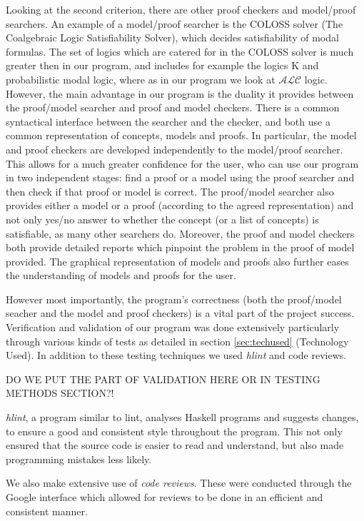 Looking at the second criterion, there are other proof checkers and model/proof searchers. An example of a model/proof searcher is the COLOSS solver (The Coalgebraic Logic Satisfiability Solver), which decides satisfiability of modal formulas. The set of logics which are catered for in the COLOSS solver is much greater then in our program, and includes for example the logics K and probabilistic modal logic, where as in our program we look at $\mathcal{ALC}$ logic. However, the main advantage in our program is the duality it provides between the proof/model searcher and proof and model checkers. There is a common syntactical interface between the searcher and the checker, and both use a common representation of concepts, models and proofs. In particular, the model and proof checkers are developed independently to the model/proof searcher. This allows for a much greater confidence for the user, who can use our program in two independent stages: find a proof or a model using the proof searcher and then check if that proof or model is correct. The proof/model searcher also provides either a model or a proof (according to the agreed representation) and not only yes/no answer to whether the concept (or a list of concepts) is satisfiable, as many other searchers do. Moreover, the proof and model checkers both provide detailed reports which pinpoint the problem in the proof of model provided. The graphical representation of models and proofs also further eases the understanding of models and proofs for the user.

However most importantly, the program's correctness (both the proof/model seacher and the model and proof checkers) is a vital part of the project success. Verification and validation of our program was done extensively particularly through various kinds of tests as detailed in section \ref{sec:techused} (Technology Used). In addition to these testing techniques we used \emph{hlint} and code reviews. 

DO WE PUT THE PART OF VALIDATION HERE OR IN TESTING METHODS SECTION?!

\emph{hlint}, a program similar to lint, analyses Haskell programs and suggests changes, to ensure a good and consistent style throughout the program. This not only ensured that the source code is easier to read and understand, but also made programming mistakes less likely.

We also make extensive use of \emph{code reviews}. These were conducted through the Google interface which allowed for reviews to be done
in an efficient and consistent manner. 

